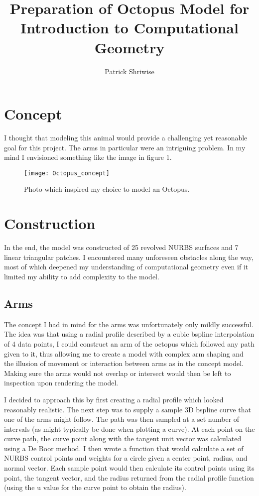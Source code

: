 \documentclass[twocolumn]{article}
\begin{document}
\author{Patrick Shriwise}
\title{Preparation of Octopus Model for Introduction to Computational Geometry	}
\maketitle


\section{Concept}

I thought that modeling this animal would provide a challenging yet reasonable goal for this project. The arms in particular were an intriguing problem. In my mind I envisioned something like the image in figure 1. 

\begin{figure}[h!]
\begin{center}
\texttt{[image: Octopus\_concept]}
\end{center}
\caption{Photo which inspired my choice to model an Octopus.}
\end{figure}


\section{Construction}

In the end, the model was constructed of 25 revolved NURBS surfaces and 7 linear triangular patches. I encountered many unforeseen obstacles along the way, most of which deepened my understanding of computational geometry even if it limited my ability to add complexity to the model. 

\subsection{Arms}

The concept I had in mind for the arms was unfortunately only mildly successful. The idea was that using a radial profile described by a cubic bspline interpolation of 4 data points, I could construct an arm of the octopus which followed any path given to it, thus allowing me to create a model with complex arm shaping and the illusion of movement or interaction between arms as in the concept model. Making sure the arms would not overlap or intersect would then be left to inspection upon rendering the model. 

I decided to approach this by first creating a radial profile which looked reasonably realistic. The next step was to supply a sample 3D bspline curve that one of the arms might follow. The path was then sampled at a set number of intervals (as might typically be done when plotting a curve). At each point on the curve path, the curve point along with the tangent unit vector was calculated using a De Boor method. I then wrote a function that would calculate a set of NURBS control points and weights for a circle given a center point, radius, and normal vector. Each sample point would then calculate its control points using its point, the tangent vector, and the radius returned from the radial profile function (using the u value for the curve point to obtain the radius). 
\end{document}
